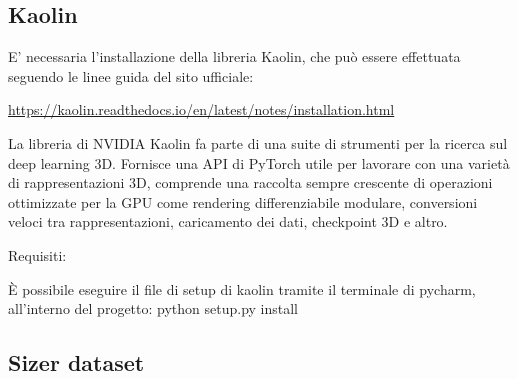 \newpage

\subsection{Kaolin}

\medskip

E’ necessaria l’installazione della libreria Kaolin, che può essere effettuata seguendo le linee guida del sito ufficiale: 

\medskip

\url{https://kaolin.readthedocs.io/en/latest/notes/installation.html}

\medskip

La libreria di NVIDIA Kaolin fa parte di una suite di strumenti per la ricerca sul deep learning 3D. Fornisce una API di PyTorch utile per lavorare con una varietà di rappresentazioni 3D, comprende una raccolta sempre crescente di operazioni ottimizzate per la GPU come rendering differenziabile modulare, conversioni veloci tra rappresentazioni, caricamento dei dati, checkpoint 3D e altro.

\medskip

Requisiti:








\medskip

È possibile eseguire il file di setup di kaolin tramite il terminale di pycharm, all’interno del progetto:
python setup.py install

\medskip



\subsection{Sizer dataset}

